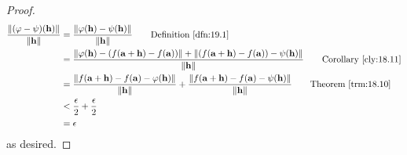\documentclass[../main.tex]{subfiles}
\begin{document}
\begin{proposition}
\begin{proof}
\begin{align*}
            \frac{\norm{(\varphi-\psi)(\h)}}{\norm{\h}} &= \frac{\norm{\varphi(\h)-\psi(\h)}}{\norm{\h}}\tag*{Definition \ref{dfn:19.1}}\\
            &= \frac{\norm{\varphi(\h)-(f(\mathbf{a}+\h)-f(\mathbf{a}))}+\norm{(f(\mathbf{a}+\h)-f(\mathbf{a}))-\psi(\h)}}{\norm{\h}}\tag*{Corollary \ref{cly:18.11}}\\
            &= \frac{\norm{f(\mathbf{a}+\h)-f(\mathbf{a})-\varphi(\h)}}{\norm{\h}}+\frac{\norm{f(\mathbf{a}+\h)-f(\mathbf{a})-\psi(\h)}}{\norm{\h}}\tag*{Theorem \ref{trm:18.10}}\\
            &< \frac{\epsilon}{2}+\frac{\epsilon}{2}\\
            &= \epsilon
        \end{align*}
        as desired.
    \end{proof}
\end{proposition}
\end{document}
